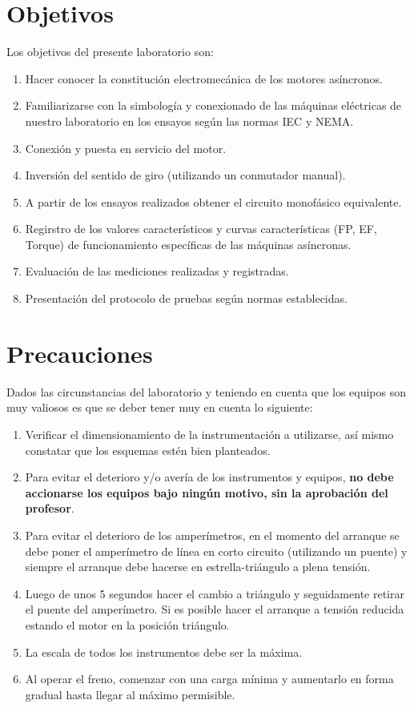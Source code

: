 \documentclass[a4paper,12pt]{article}
\begin{document}
\section{Objetivos}
Los objetivos del presente laboratorio son:
\begin{enumerate}
    \item Hacer conocer la constitución electromecánica de los motores asíncronos.
    \item Familiarizarse con la simbología y conexionado de las máquinas eléctricas de nuestro laboratorio en los ensayos según las normas IEC y NEMA.
    \item Conexión y puesta en servicio del motor.
    \item Inversión del sentido de giro (utilizando un conmutador manual).
    \item A partir de los ensayos realizados obtener el circuito monofásico equivalente.
    \item Regirstro de los valores característicos y curvas características (FP, EF, Torque) de funcionamiento específicas de las máquinas asíncronas.
    \item Evaluación de las mediciones realizadas y registradas.
    \item Presentación del protocolo de pruebas según normas establecidas.
\end{enumerate}
\newpage
\section{Precauciones}
Dados las circunstancias del laboratorio y teniendo en cuenta que los equipos son muy valiosos es que se deber tener muy en cuenta lo siguiente:
\begin{enumerate}
    \item Verificar el dimensionamiento de la instrumentación a utilizarse, así mismo constatar que los esquemas estén bien planteados.
    \item Para evitar el deterioro y/o avería de los instrumentos y equipos, \textbf{no debe accionarse los equipos bajo ningún motivo, sin la aprobación del profesor}.
    \item Para evitar el deterioro de los amperímetros, en el momento del arranque se debe poner el amperímetro de línea en corto circuito (utilizando un puente) y siempre el arranque debe hacerse en estrella-triángulo a plena tensión.
    \item Luego de unos 5 segundos hacer el cambio a triángulo y seguidamente retirar el puente del amperímetro. Si es posible hacer el arranque a tensión reducida estando el motor en la posición triángulo.
    \item La escala de todos los instrumentos debe ser la máxima.
    \item Al operar el freno, comenzar con una carga mínima y aumentarlo en forma gradual hasta llegar al máximo permisible.
\end{enumerate}
\newpage
\end{document}
